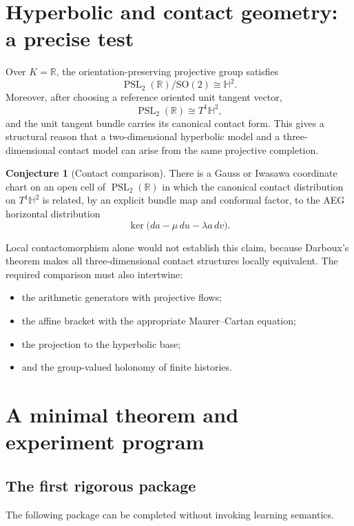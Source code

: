 \documentclass[11pt]{article}
\theoremstyle{definition}
\newtheorem{conjecture}[theorem]{Conjecture}
\theoremstyle{remark}
\newcommand{\PSL}{\operatorname{PSL}}
\begin{document}
\section{Hyperbolic and contact geometry: a precise test}

Over \(K=\mathbb R\), the orientation-preserving projective group satisfies
\[
\PSL_2(\mathbb R)/\mathrm{SO}(2)\cong\mathbb H^2.
\]
Moreover, after choosing a reference oriented unit tangent vector,
\[
\PSL_2(\mathbb R)\cong T^1\mathbb H^2,
\]
and the unit tangent bundle carries its canonical contact form.  This gives a
structural reason that a two-dimensional hyperbolic model and a
three-dimensional contact model can arise from the same projective completion.

\begin{conjecture}[Contact comparison]
There is a Gauss or Iwasawa coordinate chart on an open cell of
\(\PSL_2(\mathbb R)\) in which the canonical contact distribution on
\(T^1\mathbb H^2\) is related, by an explicit bundle map and conformal factor,
to the AEG horizontal distribution
\[
\ker\bigl(da-\mu\,du-\lambda a\,dv\bigr).
\]
\end{conjecture}

Local contactomorphism alone would not establish this claim, because Darboux's
theorem makes all three-dimensional contact structures locally equivalent.
The required comparison must also intertwine:
\begin{itemize}
  \item the arithmetic generators with projective flows;
  \item the affine bracket with the appropriate Maurer--Cartan equation;
  \item the projection to the hyperbolic base;
  \item and the group-valued holonomy of finite histories.
\end{itemize}

\section{A minimal theorem and experiment program}

\subsection{The first rigorous package}

The following package can be completed without invoking learning semantics.
\end{document}
